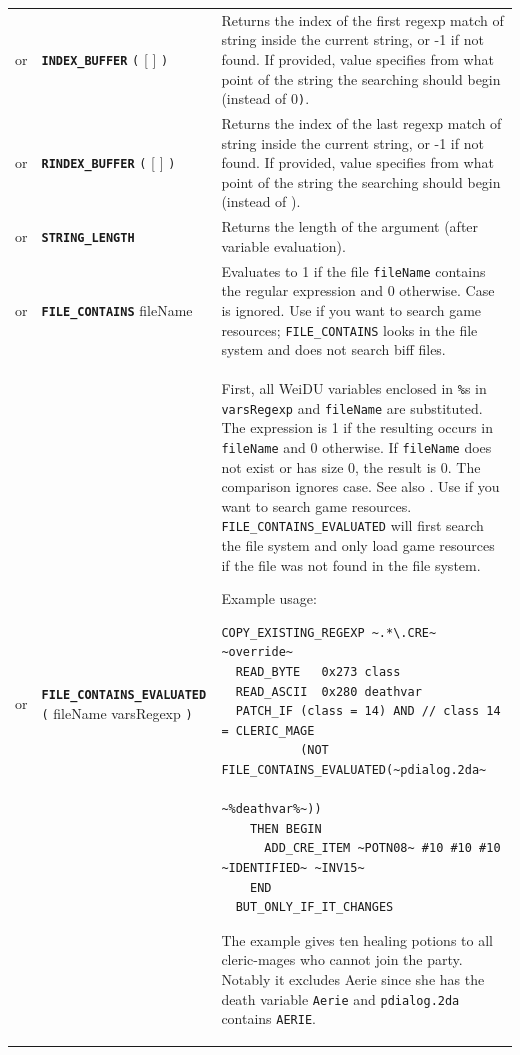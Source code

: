 \documentclass{article}
\def\ttref#1{\ahrefloc{#1}{\tt #1}}
\def\DEFINE#1{{\tt \bf #1}\label{#1}\index{#1}}
\def\t#1{{\tt #1}}
\def\Ob{{\color{red} [ }}
\def\Oe{{\color{red} ] }}
\begin{document}
\begin{tabular}{cp{10in}|p{10in}}
or & \DEFINE{INDEX_BUFFER} \t{(}  \ttref{optcase}  \ttref{optexact} \ttref{string}
\Ob \ttref{value} \Oe \t{)} &
Returns the index of the first regexp match of string inside the current string, or
-1 if not found. If provided, value specifies from what point of the string
the searching should begin (instead of 0\t).
\\

or & \DEFINE{RINDEX_BUFFER} \t{(}  \ttref{optcase}  \ttref{optexact} \ttref{string}
\Ob \ttref{value} \Oe \t{)} &
Returns the index of the last regexp match of string inside the current string, or
-1 if not found. If provided, value specifies from what point of the string
the searching should begin (instead of \ttref{BUFFER_LENGTH}).
\\


or & \DEFINE{STRING_LENGTH} \ttref{String} &
Returns the length of the argument \ttref{String} (after variable evaluation). \\

or & \DEFINE{FILE_CONTAINS} fileName \ttref{regexp} &

  Evaluates to 1 if the file \t{fileName} contains the regular
  expression \ttref{regexp} and 0 otherwise. Case is ignored. Use
  \ttref{RESOURCE_CONTAINS} if you want to search game resources;
  \t{FILE_CONTAINS} looks in the file system and does not search biff
  files. \\

or & \DEFINE{FILE_CONTAINS_EVALUATED} \t{(} fileName varsRegexp \t{)} &

  First, all WeiDU variables enclosed in \t{\%}s in \t{varsRegexp} and
  \t{fileName} are substituted. The expression is 1 if the resulting
  \ttref{regexp} occurs in \t{fileName} and 0 otherwise. If
  \t{fileName} does not exist or has size 0, the result is 0. The
  comparison ignores case.  See also \ttref{FILE_CONTAINS}. Use
  \ttref{RESOURCE_CONTAINS} if you want to search game
  resources. \t{FILE_CONTAINS_EVALUATED} will first search the file
  system and only load game resources if the file was not found in the
  file system.

  Example usage:

\begin{verbatim}
COPY_EXISTING_REGEXP ~.*\.CRE~ ~override~
  READ_BYTE   0x273 class
  READ_ASCII  0x280 deathvar
  PATCH_IF (class = 14) AND // class 14 = CLERIC_MAGE
           (NOT FILE_CONTAINS_EVALUATED(~pdialog.2da~
                                        ~%deathvar%~))
    THEN BEGIN
      ADD_CRE_ITEM ~POTN08~ #10 #10 #10 ~IDENTIFIED~ ~INV15~
    END
  BUT_ONLY_IF_IT_CHANGES
\end{verbatim}
The example gives ten healing potions to all cleric-mages who cannot join
the party. Notably it excludes Aerie
since she has the death variable \t{Aerie} and \t{pdialog.2da} contains
\t{AERIE}.  \\


\end{tabular}
\end{document}
